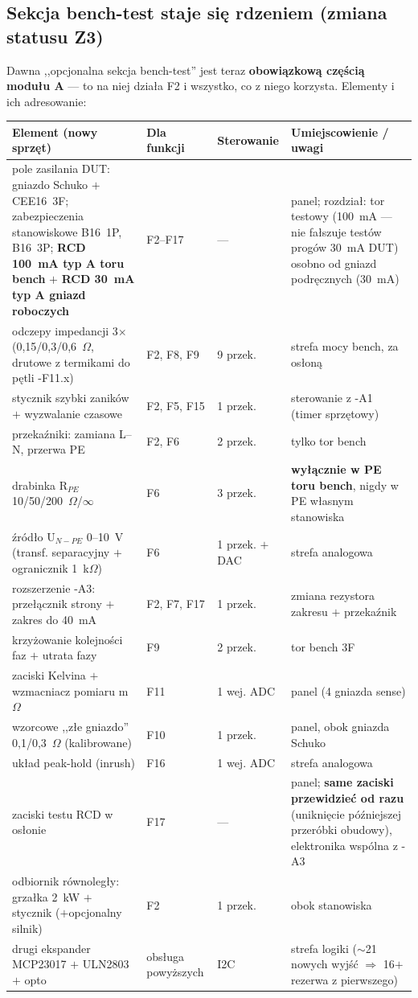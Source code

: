 \documentclass[11pt,a4paper]{article}
\newcommand{\ohm}{$\Omega$}
\begin{document}
\subsection{Sekcja bench-test staje się rdzeniem (zmiana statusu Z3)}
Dawna ,,opcjonalna sekcja bench-test'' jest teraz \textbf{obowiązkową częścią modułu A} --- to na
niej działa F2 i wszystko, co z niego korzysta. Elementy i ich adresowanie:
\begin{longtable}{@{}p{}p{}p{}p{}@{}}
\toprule
\textbf{Element (nowy sprzęt)} & \textbf{Dla funkcji} & \textbf{Sterowanie} & \textbf{Umiejscowienie / uwagi}\\
\midrule
pole zasilania DUT: gniazdo Schuko $+$ CEE16~3F; zabezpieczenia stanowiskowe B16~1P, B16~3P;
\textbf{RCD 100~mA typ A toru bench} $+$ \textbf{RCD 30~mA typ A gniazd roboczych} & F2--F17 &
--- & panel; rozdział: tor testowy (100~mA --- nie fałszuje testów progów 30~mA DUT) osobno od
gniazd podręcznych (30~mA)\\
odczepy impedancji 3$\times$(0,15/0,3/0,6~\ohm, drutowe z termikami do pętli -F11.x) & F2, F8, F9
& 9 przek. & strefa mocy bench, za osłoną\\
stycznik szybki zaników $+$ wyzwalanie czasowe & F2, F5, F15 & 1 przek. & sterowanie z -A1 (timer sprzętowy)\\
przekaźniki: zamiana L--N, przerwa PE & F2, F6 & 2 przek. & tylko tor bench\\
drabinka R$_{PE}$ 10/50/200~\ohm/$\infty$ & F6 & 3 przek. & \textbf{wyłącznie w PE toru bench}, nigdy w PE własnym stanowiska\\
źródło U$_{N-PE}$ 0--10~V (transf. separacyjny $+$ ogranicznik 1~k\ohm) & F6 & 1 przek. $+$ DAC & strefa analogowa\\
rozszerzenie -A3: przełącznik strony $+$ zakres do 40~mA & F2, F7, F17 & 1 przek. & zmiana rezystora zakresu $+$ przekaźnik\\
krzyżowanie kolejności faz $+$ utrata fazy & F9 & 2 przek. & tor bench 3F\\
zaciski Kelvina $+$ wzmacniacz pomiaru m\ohm & F11 & 1 wej. ADC & panel (4 gniazda sense)\\
wzorcowe ,,złe gniazdo'' 0,1/0,3~\ohm{} (kalibrowane) & F10 & 1 przek. & panel, obok gniazda Schuko\\
układ peak-hold (inrush) & F16 & 1 wej. ADC & strefa analogowa\\
zaciski testu RCD w osłonie & F17 & --- & panel; \textbf{same zaciski przewidzieć od razu} (uniknięcie późniejszej przeróbki obudowy), elektronika wspólna z -A3\\
odbiornik równoległy: grzałka 2~kW $+$ stycznik ($+$opcjonalny silnik) & F2 & 1 przek. & obok stanowiska\\
drugi ekspander MCP23017 $+$ ULN2803 $+$ opto & obsługa powyższych & I2C & strefa logiki ($\sim$21 nowych wyjść $\Rightarrow$ 16$+$rezerwa z pierwszego)\\
\bottomrule
\end{longtable}
\end{document}

